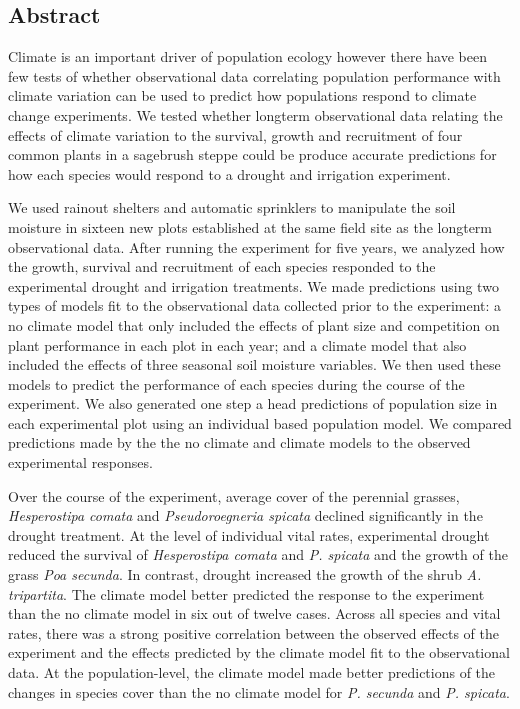 \documentclass[11pt]{article}
\begin{document}
\begin{doublespacing} 

\linenumbers

\section*{Abstract}

Climate is an important driver of population ecology however there have been few tests of whether observational data correlating population performance with climate variation can be used to predict how populations respond to climate change experiments. We tested whether longterm observational data relating the effects of climate variation to the survival, growth and recruitment of four common plants in a sagebrush steppe could be produce accurate predictions for how each species would respond to a drought and irrigation experiment. 

We used rainout shelters and automatic sprinklers to manipulate the soil moisture in sixteen new plots established at the same field site as the longterm observational data. After running the experiment for five years, we analyzed how the growth, survival and recruitment of each species responded to the experimental drought and irrigation treatments. We made predictions using two types of models fit to the observational data collected prior to the experiment: a no climate model that only included the effects of plant size and competition on plant performance in each plot in each year; and a climate model that also included the effects of three seasonal soil moisture variables. We then used these models to predict the performance of each species during the course of the experiment. We also generated one step a head predictions of population size in each experimental plot using an individual based population model. We compared predictions made by the the no climate and climate models to the observed experimental responses. 

Over the course of the experiment, average cover of the perennial grasses, \textit{Hesperostipa comata} and \textit{Pseudoroegneria spicata} declined significantly in the drought treatment. At the level of individual vital rates, experimental drought reduced the survival of \textit{Hesperostipa comata} and \textit{P. spicata}  and the growth of the grass \textit{Poa secunda}. In contrast, drought increased the growth of the shrub \textit{A. tripartita}. The climate model better predicted the response to the experiment than the no climate model in six out of twelve cases. Across all species and vital rates, there was a strong positive correlation between the observed effects of the experiment and the effects predicted by the climate model fit to the observational data. At the population-level, the climate model made better predictions of the changes in species cover than the no climate model for \textit{P. secunda} and \textit{P. spicata}. 


\end{doublespacing}
\end{document}
